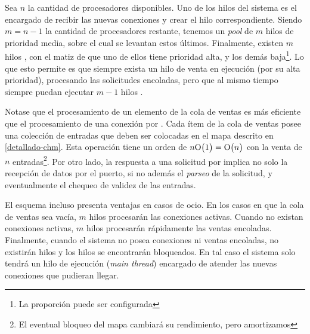 Sea \(n\) la cantidad de procesadores disponibles.
Uno de los hilos del sistema es el encargado de recibir las nuevas conexiones y crear el hilo  correspondiente.
Siendo \(m = n - 1\) la cantidad de procesadores restante, tenemos un \emph{pool} de \(m\) hilos de prioridad media, sobre el cual se levantan estos últimos.
Finalmente, existen \(m\) hilos , con el matiz de que uno de ellos tiene prioridad alta, y los demás baja\footnote{La proporción puede ser configurada}.
Lo que esto permite es que siempre exista un hilo de venta en ejecución (por su alta prioridad), procesando las solicitudes encoladas,
pero que al mismo tiempo siempre puedan ejecutar \(m - 1\) hilos .

Notase que el procesamiento de un elemento de la cola de ventas es más eficiente que el procesamiento de una conexión por .
Cada ítem de la cola de ventas posee una colección de entradas que deben ser colocadas en el mapa descrito en \ref{detallado-chm}.
Esta operación tiene un orden de \(n\mathrm{O}\bigl(1\bigr) = \mathrm{O}\bigl(n\bigr) \) con la venta de \(n\) entradas\footnote{El eventual bloqueo del mapa cambiará su rendimiento, pero amortizamos}.
Por otro lado, la respuesta a una solicitud por  implica no solo la recepción de datos por el puerto,
si no además el \emph{parseo} de la solicitud, y eventualmente el chequeo de validez de las entradas.


\begin{figure}
\end{figure}

El esquema incluso presenta ventajas en casos de ocio.
En los casos en que la cola de ventas sea vacía, \(m\) hilos procesarán las conexiones activas.
Cuando no existan conexiones activas, \(m\) hilos procesarán rápidamente las ventas encoladas.
Finalmente, cuando el sistema no posea conexiones ni ventas encoladas, no existirán hilos  y los hilos  se encontrarán bloqueados.
En tal caso el sistema solo tendrá un hilo de ejecución (\emph{main thread}) encargado de atender las nuevas conexiones que pudieran llegar.

